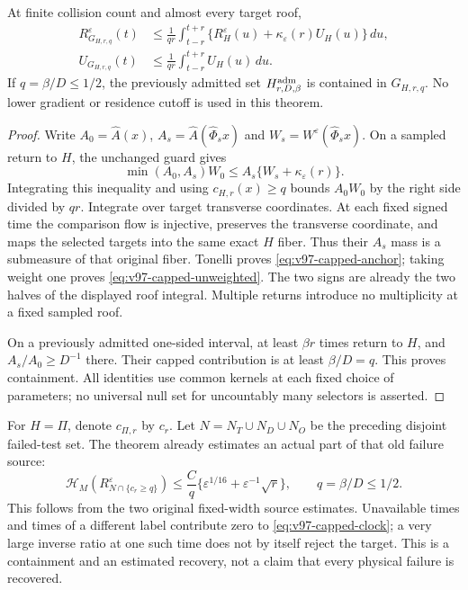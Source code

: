 \begin{theorem}
\label{thm:v97-capped-anchor}
At finite collision count and almost every target roof,
\begin{align}
 R_{G_{H,r,q}}^\varepsilon(t)
 &\le\frac1{qr}\int_{t-r}^{t+r}
       \{R_H^\varepsilon(u)+\kappa_\varepsilon(r)U_H(u)\}\,du,
                                      \label{eq:v97-capped-anchor}\\
 U_{G_{H,r,q}}(t)&\le\frac1{qr}\int_{t-r}^{t+r}U_H(u)\,du.
                                      \label{eq:v97-capped-unweighted}
\end{align}
If $q=\beta/D\le1/2$, the previously admitted set
$H^{\rm adm}_{r,D,\beta}$ is contained in $G_{H,r,q}$.
No lower gradient or residence cutoff is used in this theorem.
\end{theorem}
\begin{proof}
Write $A_0=\widehat A(x)$, $A_s=\widehat A(\widehat\Phi_sx)$
and $W_s=W^\varepsilon(\widehat\Phi_sx)$. On a sampled return to
$H$, the unchanged guard gives
\[
 \min(A_0,A_s)W_0\le A_s\{W_s+\kappa_\varepsilon(r)\}.
\]
Integrating this inequality and using $c_{H,r}(x)\ge q$ bounds
$A_0W_0$ by the right side divided by $qr$. Integrate over target
transverse coordinates. At each fixed signed time the comparison
flow is injective, preserves the transverse coordinate, and maps the
selected targets into the same exact $H$ fiber. Thus their $A_s$
mass is a submeasure of that original fiber. Tonelli proves
\eqref{eq:v97-capped-anchor}; taking weight one proves
\eqref{eq:v97-capped-unweighted}. The two signs are already the two
halves of the displayed roof integral. Multiple returns introduce
no multiplicity at a fixed sampled roof.

On a previously admitted one-sided interval, at least $\beta r$
times return to $H$, and $A_s/A_0\ge D^{-1}$ there. Their capped
contribution is at least $\beta/D=q$. This proves containment.
All identities use common kernels at each fixed choice of parameters;
no universal null set for uncountably many selectors is asserted.
\end{proof}

For $H=\Pi$, denote $c_{\Pi,r}$ by $c_r$. Let $N=N_T\cup N_D\cup N_O$
be the preceding disjoint failed-test set. The theorem already estimates
an actual part of that old failure source:
\begin{equation}\label{eq:v97-first-recovery}
 \mathcal H_M\left(R_{N\cap\{c_r\ge q\}}^\varepsilon\right)
 \le\frac Cq\{\varepsilon^{1/16}+\varepsilon^{-1}\sqrt r\},
 \qquad q=\beta/D\le1/2.
\end{equation}
This follows from the two original fixed-width source estimates.
Unavailable times and times of a different label contribute zero to
\eqref{eq:v97-capped-clock}; a very large inverse ratio at one such
time does not by itself reject the target. This is a containment and
an estimated recovery, not a claim that every physical failure is recovered.
